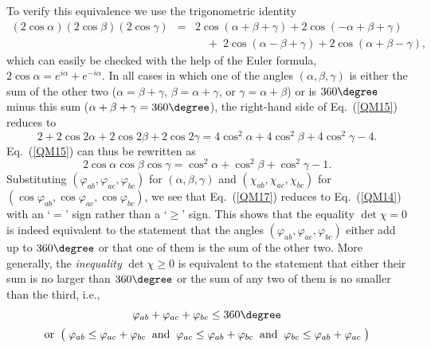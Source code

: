 To verify this equivalence we use the trigonometric identity
\begin{eqnarray}
(2 \cos{\alpha}) (2 \cos{\beta}) (2 \cos{\gamma}) & \! \!  = \! \!  & 2 \cos{(\alpha + \beta + \gamma)}
+ 2 \cos{(- \alpha + \beta + \gamma)} \nonumber \\
 & & \quad  + \; 2 \cos{(\alpha - \beta + \gamma)} + 2 \cos{(\alpha + \beta - \gamma)}, 
\label{QM15}
\end{eqnarray}
which can easily be checked with the help of the Euler formula, $2 \cos{\alpha} = e^{i \alpha} + e^{-i \alpha}$. In all cases in which one of the angles $(\alpha, \beta, \gamma)$ is either the sum of the other two ($\alpha = \beta + \gamma$, $\beta = \alpha + \gamma$, or $\gamma = \alpha + \beta$) or is $360\degree$ minus this sum ($\alpha+\beta+\gamma=360\degree$), the right-hand side of Eq.\ (\ref{QM15}) reduces to
\begin{equation}
2 + 2 \cos{2 \alpha} + 2 \cos{2 \beta} + 2 \cos{2 \gamma}
= 4 \cos^2{\! \alpha} + 4 \cos^2{\!\beta} + 4 \cos^2{\!\gamma} - 4.
 \label{QM16}
\end{equation}
Eq.\ (\ref{QM15}) can thus be rewritten as
\begin{equation}
2 \cos{\alpha} \cos{\beta} \cos{\gamma} = \cos^2{\!\alpha} + \cos^2{\!\beta} + \cos^2{\!\gamma} - 1.
\label{QM17}
\end{equation}
Substituting $(\varphi_{ab}, \varphi_{ac}, \varphi_{bc})$ for  $(\alpha, \beta, \gamma)$ and $(\chi_{ab}, \chi_{ac}, \chi_{bc})$ for  $(\cos{\varphi_{ab}}, \cos{\varphi_{ac}}, \cos{\varphi_{bc}})$, 
we see that Eq.\ (\ref{QM17}) reduces to Eq.\ (\ref{QM14}) with an `$=$' sign rather than a `$\ge$' sign. This shows that the equality $\det{\chi} =0$ is indeed equivalent to the statement that the angles $(\varphi_{ab}, \varphi_{ac}, \varphi_{bc})$ either add up to $360\degree$ or that one of them is the sum of the other two. More generally, the \emph{inequality} $\det \chi\geq 0$ is equivalent to the statement that either their sum is no larger than $360\degree$ or the sum of any two of them is no smaller than the third, i.e.,  
\begin{equation}
\begin{array}{c}
 \varphi_{ab} +  \varphi_{ac} + \varphi_{bc} \le 360\degree  \\[.2cm]
\mathrm{or} \;\; \big( \; \varphi_{ab} \le  \varphi_{ac} + \varphi_{bc} \;\; \mathrm{and} \;\; \varphi_{ac} \le  \varphi_{ab} + \varphi_{bc}  \;\;  \mathrm{and} \;\; \varphi_{bc} \le  \varphi_{ab} + \varphi_{ac} \; \big) 
\end{array}
\label{angle inequalities}
\end{equation}
